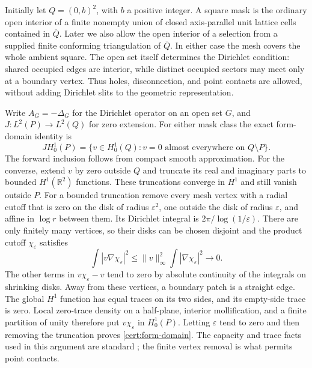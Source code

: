 \documentclass[11pt,reqno]{amsart}
\numberwithin{equation}{section}
\newcommand{\R}{\mathbb R}
\newcommand{\norm}[1]{\lVert#1\rVert}
\begin{document}
Initially let $Q=(0,b)^2$, with $b$ a positive integer.  A square mask is the ordinary open
interior of a finite nonempty union of closed axis-parallel unit
lattice cells contained in $\overline Q$.  Later we also allow the
open interior of a selection from a supplied finite conforming
triangulation of $\overline Q$.  In either case the mesh covers
the whole ambient square.  The open set itself determines the
Dirichlet condition: shared occupied edges are interior, while
distinct occupied sectors may meet only at a boundary vertex.
Thus holes, disconnection, and point contacts are allowed, without
adding Dirichlet slits to the geometric representation.

Write $A_G=-\Delta_G$ for the Dirichlet operator on an open set $G$,
and $J:L^2(P)\longrightarrow L^2(Q)$ for zero extension.  For either
mask class the exact form-domain identity is
\begin{equation}\label{cert:form-domain}
 JH^1_0(P)=
 \{v\in H^1_0(Q):v=0\text{ almost everywhere on }Q\setminus P\}.
\end{equation}
The forward inclusion follows from compact smooth approximation.
For the converse, extend $v$ by zero outside $Q$ and truncate its
real and imaginary parts to bounded $H^1(\R^2)$ functions.  These
truncations converge in $H^1$ and still vanish outside $P$.
For a bounded truncation remove every mesh vertex with a radial
cutoff that is zero on the disk of radius $\varepsilon^2$, one
outside the disk of radius $\varepsilon$, and affine in $\log r$
between them.  Its Dirichlet integral is
$2\pi/\log(1/\varepsilon)$.  There are only finitely many vertices,
so their disks can be chosen disjoint and the product cutoff
$\chi_\varepsilon$ satisfies
\[
 \int |v\nabla\chi_\varepsilon|^2
 \le \norm v_\infty^2\int|\nabla\chi_\varepsilon|^2
 \longrightarrow0.
\]
The other terms in $v\chi_\varepsilon-v$ tend to zero by absolute
continuity of the integrals on shrinking disks.  Away from these
vertices, a boundary patch is a straight edge.  The global $H^1$
function has equal traces on its two sides, and its empty-side
trace is zero.  Local zero-trace density on a half-plane, interior
mollification, and a finite partition of unity therefore put
$v\chi_\varepsilon$ in $H^1_0(P)$.  Letting $\varepsilon$ tend to
zero and then removing the truncation proves
\eqref{cert:form-domain}.  The capacity and trace facts used in
this argument are standard \cite{EvansGariepy2015}; the finite
vertex removal is what permits point contacts.
\end{document}
